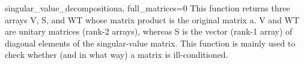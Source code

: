 \begin{funcdesc}{singular_value_decomposition}{a, full_matrices=0}
   This function returns three arrays V, S, and WT whose matrix product is the
   original matrix a. V and WT are unitary matrices (rank-2 arrays), whereas S
   is the vector (rank-1 array) of diagonal elements of the singular-value
   matrix. This function is mainly used to check whether (and in what way) a
   matrix is ill-conditioned.
\end{funcdesc}
 



